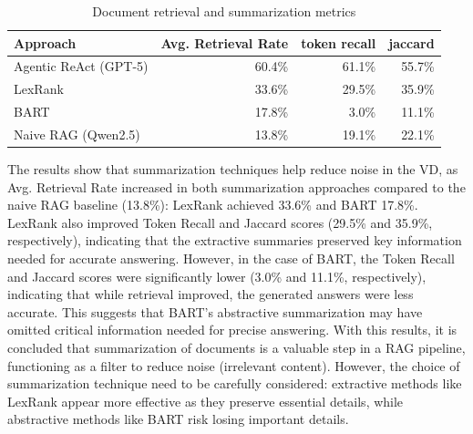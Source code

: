 \begin{table}[t]
\centering
\caption{Document retrieval and summarization metrics}
\label{tab:document_retrieved_metrics_summarization}
\begin{tabular}{lrrr}
\hline
Approach & Avg. Retrieval Rate & token recall & jaccard \\
\hline
Agentic ReAct (\gls{GPT}-5)& 60.4\% & 61.1\%  & 55.7\%\\
LexRank & 33.6\% & 29.5\%  & 35.9\% \\
BART & 17.8\% & 3.0\% & 11.1\% \\
Naive \gls{RAG} (Qwen2.5) & 13.8\% & 19.1\% & 22.1\% \\
\hline
\end{tabular}
\end{table}

The results show that summarization techniques help reduce noise in the \gls{VD}, as Avg. Retrieval Rate increased in both summarization approaches compared to the naive RAG baseline (13.8\%): LexRank achieved 33.6\% and BART 17.8\%.
LexRank also improved Token Recall and Jaccard scores (29.5\% and 35.9\%, respectively), indicating that the extractive summaries preserved key information needed for accurate answering.
However, in the case of BART, the Token Recall and Jaccard scores were significantly lower (3.0\% and 11.1\%, respectively), indicating that while retrieval improved, the generated answers were less accurate. This suggests that BART's abstractive summarization may have omitted critical information needed for precise answering.
With this results, it is concluded that summarization of documents is a valuable step in a \gls{RAG} pipeline, functioning as a filter to reduce noise (irrelevant content).
However, the choice of summarization technique need to be carefully considered: extractive methods like LexRank appear more effective as they preserve essential details, while abstractive methods like BART risk losing important details.


